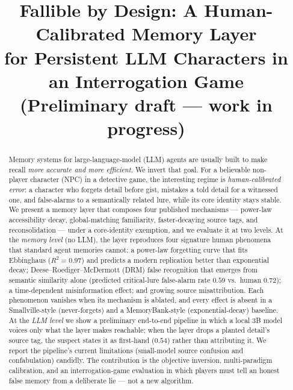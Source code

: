 \documentclass[conference]{IEEEtran}
\begin{document}
\title{Fallible by Design: A Human-Calibrated Memory Layer\\
for Persistent LLM Characters in an Interrogation Game\\
\large\textnormal{(Preliminary draft --- work in progress)}}

\author{}

\maketitle

\begin{abstract}
Memory systems for large-language-model (LLM) agents are usually built to make
recall \emph{more accurate and more efficient}. We invert that goal. For a
believable non-player character (NPC) in a detective game, the interesting
regime is \emph{human-calibrated error}: a character who forgets detail before
gist, mistakes a told detail for a witnessed one, and false-alarms to a
semantically related lure, while its core identity stays stable. We present a
memory layer that composes four published mechanisms --- power-law accessibility
decay, global-matching familiarity, faster-decaying source tags, and
reconsolidation --- under a core-identity exemption, and we evaluate it at two
levels. At the \emph{memory level} (no LLM), the layer reproduces four signature
human phenomena that standard agent memories cannot: a power-law forgetting curve
that fits Ebbinghaus ($R^2=0.97$) and predicts a modern replication better than
exponential decay; Deese--Roediger--McDermott (DRM) false recognition that
emerges from semantic similarity alone (predicted critical-lure false-alarm rate
$0.59$ vs.\ human $0.72$); a time-dependent misinformation effect; and growing
source misattribution. Each phenomenon vanishes when its mechanism is ablated,
and every effect is absent in a Smallville-style (never-forgets) and a
MemoryBank-style (exponential-decay) baseline. At the \emph{LLM level} we show a
preliminary end-to-end pipeline in which a local 3B model voices only what the
layer makes reachable; when the layer drops a planted detail's source tag, the
suspect states it as first-hand ($0.54$) rather than attributing it. We report
the pipeline's current limitations (small-model source confusion and
confabulation) candidly. The contribution is the objective inversion,
multi-paradigm calibration, and an interrogation-game evaluation in which players
must tell an honest false memory from a deliberate lie --- not a new algorithm.
\end{abstract}
\end{document}
